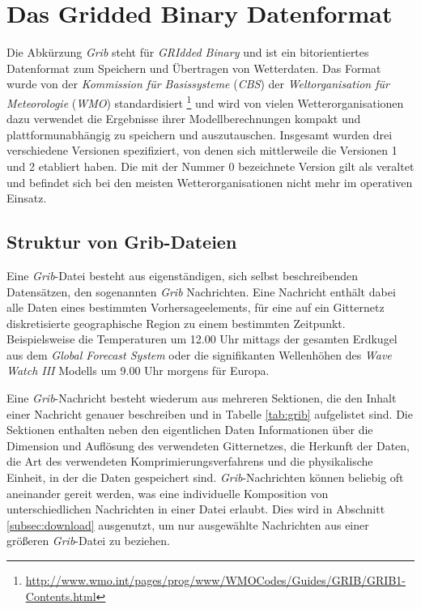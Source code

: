 \section{Das Gridded Binary Datenformat}
Die Abkürzung \textit{Grib}  steht
für \textit{GRIdded Binary} und ist ein bitorientiertes Datenformat
zum Speichern und Übertragen von Wetterdaten. Das Format wurde von der
\textit{Kommission für Basissysteme} (\textit{CBS})
 der
\textit{Weltorganisation für Meteorologie} (\textit{WMO})
 standardisiert
\footnote{\url{http://www.wmo.int/pages/prog/www/WMOCodes/Guides/GRIB/GRIB1-Contents.html}}
und wird von vielen Wetterorganisationen dazu verwendet die Ergebnisse
ihrer Modellberechnungen kompakt und plattformunabhängig zu speichern
und auszutauschen. Insgesamt wurden drei verschiedene Versionen
spezifiziert, von denen sich mittlerweile die Versionen 1 und 2
etabliert haben. Die mit der Nummer 0 bezeichnete Version gilt als
veraltet und befindet sich bei den meisten Wetterorganisationen nicht
mehr im operativen Einsatz.

\subsection{Struktur von Grib-Dateien}
Eine \textit{Grib}-Datei besteht aus eigenständigen, sich selbst
beschreibenden Datensätzen, den sogenannten \textit{Grib}
Nachrichten. Eine Nachricht enthält dabei alle Daten eines bestimmten
Vorhersageelements, für eine auf ein Gitternetz diskretisierte
geographische Region zu einem bestimmten Zeitpunkt. Beispielsweise die
Temperaturen um 12.00 Uhr mittags der gesamten Erdkugel aus dem
\textit{Global Forecast System} oder die signifikanten Wellenhöhen des
\textit{Wave Watch III} Modells um 9.00 Uhr morgens für Europa.

Eine \textit{Grib}-Nachricht besteht wiederum aus mehreren Sektionen,
die den Inhalt einer Nachricht genauer beschreiben und in Tabelle
\ref{tab:grib} aufgelistet sind. Die Sektionen enthalten neben den
eigentlichen Daten Informationen über die Dimension und Auflösung des
verwendeten Gitternetzes, die Herkunft der Daten, die Art des
verwendeten Komprimierungsverfahrens und die physikalische Einheit, in
der die Daten gespeichert sind. \textit{Grib}-Nachrichten können
beliebig oft aneinander gereit werden, was eine individuelle
Komposition von unterschiedlichen Nachrichten in einer Datei
erlaubt. Dies wird in Abschnitt \ref{subsec:download} ausgenutzt, um
nur ausgewählte Nachrichten aus einer größeren \textit{Grib}-Datei zu
beziehen.

